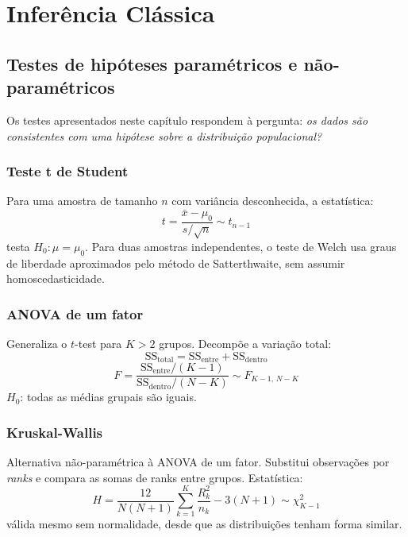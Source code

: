 \chapter{Inferência Clássica}
\label{cap:inferencia}

\section{Testes de hipóteses paramétricos e não-paramétricos}

Os testes apresentados neste capítulo respondem à pergunta: \emph{os dados
são consistentes com uma hipótese sobre a distribuição populacional?}

\subsection*{Teste t de Student}

Para uma amostra de tamanho $n$ com variância desconhecida, a estatística:
\[
  t = \frac{\bar{x} - \mu_0}{s / \sqrt{n}} \sim t_{n-1}
\]
testa $H_0: \mu = \mu_0$. Para duas amostras independentes, o teste de Welch
usa graus de liberdade aproximados pelo método de Satterthwaite, sem assumir
homoscedasticidade.

\subsection*{ANOVA de um fator}

Generaliza o $t$-test para $K > 2$ grupos. Decompõe a variação total:
\[
  \text{SS}_{\text{total}} = \text{SS}_{\text{entre}} + \text{SS}_{\text{dentro}}
\]
\[
  F = \frac{\text{SS}_{\text{entre}} / (K-1)}{\text{SS}_{\text{dentro}} / (N-K)}
  \sim F_{K-1,\, N-K}
\]
$H_0$: todas as médias grupais são iguais.

\subsection*{Kruskal-Wallis}

Alternativa não-paramétrica à ANOVA de um fator. Substitui observações por
\emph{ranks} e compara as somas de ranks entre grupos. Estatística:
\[
  H = \frac{12}{N(N+1)} \sum_{k=1}^K \frac{R_k^2}{n_k} - 3(N+1) \sim \chi^2_{K-1}
\]
válida mesmo sem normalidade, desde que as distribuições tenham forma similar.

